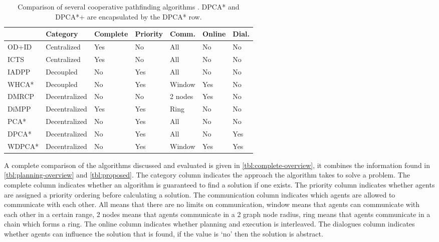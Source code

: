 \begin{table*}[h]
    \centering
    \caption{Comparison of several cooperative pathfinding algorithms 
        \cite{standley2010,standley2011,sharon2013,cap2012,silver2005,wei2016,chouhan2017}.
        DPCA* and DPCA*+ are encapsulated by the DPCA* row.}
    \label{tbl:complete-overview}
    \begin{tabular}{l|l|l|l|l|l|l}
        & Category & Complete & Priority & Comm. & Online & Dial. \\
        \hline
        OD+ID & Centralized & Yes & No &
        All & No & No \\
        ICTS & Centralized & Yes & No & All & No & No \\
        IADPP & Decoupled & No & Yes & All & No & No \\
        WHCA* & Decoupled & No & Yes & Window & Yes & No \\
        DMRCP & Decentralized & No & No & 2 nodes & Yes & No \\
        DiMPP & Decentralized & Yes & Yes & Ring & No & No \\
        \hline
        PCA* & Decentralized & No & Yes & All & No & No \\
        DPCA* & Decentralized & No & Yes & All & 
        No & Yes \\
        WDPCA* & Decentralized & No & Yes & Window & Yes & Yes
    \end{tabular}
\end{table*}

A complete comparison of the algorithms discussed and evaluated is given in 
\autoref{tbl:complete-overview}, it combines the information found in 
\autoref{tbl:planning-overview} and \autoref{tbl:proposed}. The category column 
indicates the approach the algorithm takes to solve a problem. The complete 
column indicates whether an algorithm is guaranteed to find a solution if one 
exists. The priority column indicates whether agents are assigned a priority 
ordering before calculating a solution. The communication column indicates 
which agents are allowed to communicate with each other. All means that there 
are no limits on communication, window means that agents can communicate with 
each other in a certain range, 2 nodes means that agents communicate in a 2 
graph node radius, ring means that agents communicate in a chain which forms a 
ring. The online column indicates whether planning and execution is 
interleaved. The dialogues column indicates whether agents can influence the 
solution that is found, if the value is `no' then the solution is abstract.


